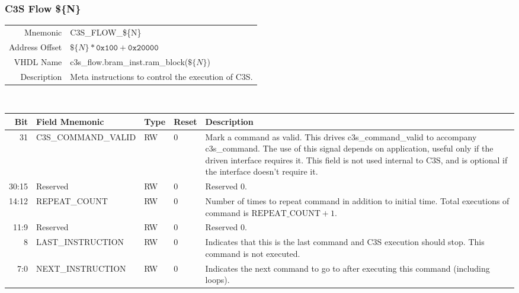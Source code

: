 \subsubsection{C3S Flow \$\{N\}}
\begin{tabular}{ r | p{350px} }
  Mnemonic       & C3S\_FLOW\_\$\{N\}                            \\
  Address Offset & $\$\{N\} * \texttt{0x100} + \texttt{0x20000}$ \\
  VHDL Name      & c3s\_flow.bram\_inst.ram\_block($\$\{N\}$)    \\ \hline

  Description &
  Meta instructions to control the execution of C3S.
\end{tabular}
\\
\begin{tabularx}{\textwidth}{r|l|l|l|X}
  \hline
  Bit   & Field Mnemonic      & Type & Reset & Description \\ \hline

  31    & C3S\_COMMAND\_VALID & RW   & 0     &

  Mark a command as valid. This drives c3s\_command\_valid to
  accompany c3s\_command. The use of this signal depends on
  application, useful only if the driven interface requires it. This
  field is not used internal to C3S, and is optional if the interface
  doesn't require it. \\

  30:15 & Reserved            & RW   & 0     &

  Reserved 0. \\

  14:12  & REPEAT\_COUNT      & RW   & 0     &

  Number of times to repeat command in addition to initial time. Total
  executions of command is $\textrm{REPEAT\_COUNT} + 1.$ \\

  11:9  & Reserved            & RW   & 0     &

  Reserved 0. \\

  8     & LAST\_INSTRUCTION   & RW   & 0     &

  Indicates that this is the last command and C3S execution should
  stop. This command is not executed. \\

  7:0   & NEXT\_INSTRUCTION   & RW   & 0     &

  Indicates the next command to go to after executing this command
  (including loops). \\
\end{tabularx}

